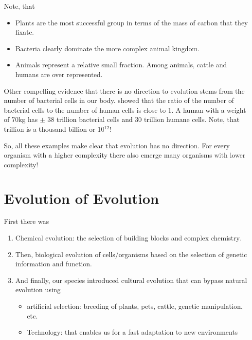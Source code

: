 \documentclass[
  11pt,
]{book}
\providecommand{\tightlist}{%
  \setlength{\itemsep}{0pt}\setlength{\parskip}{0pt}}
\begin{document}
Note, that

\begin{itemize}
\item
  Plants are the most successful group in terms of the mass of carbon that they fixate.
\item
  Bacteria clearly dominate the more complex animal kingdom.
\item
  Animals represent a relative small fraction. Among animals, cattle and humans are over represented.
\end{itemize}

Other compelling evidence that there is no direction to evolution stems from the number of bacterial cells in our body. \citet{Sender2016} showed that the ratio of the number of bacterial cells to the number of human cells is close to 1. A human with a weight of 70kg has \(\pm\) 38 trillion bacterial cells and 30 trillion humane cells. Note, that trillion is a thousand billion or 10\(^{12}\)!

So, all these examples make clear that evolution has no direction. For every organism with a higher complexity there also emerge many organisms with lower complexity!

\hypertarget{evolution-of-evolution}{%
\section{Evolution of Evolution}\label{evolution-of-evolution}}

First there was

\begin{enumerate}
\def\labelenumi{\arabic{enumi}.}
\item
  Chemical evolution: the selection of building blocks and complex chemistry.
\item
  Then, biological evolution of cells/organisms based on the selection of genetic information and function.
\item
  And finally, our species introduced cultural evolution that can bypass natural evolution using

  \begin{itemize}
  \tightlist
  \item
    artificial selection: breeding of plants, pets, cattle, genetic manipulation, etc.
  \item
    Technology: that enables us for a fast adaptation to new environments
  \end{itemize}
\end{enumerate}
\end{document}
